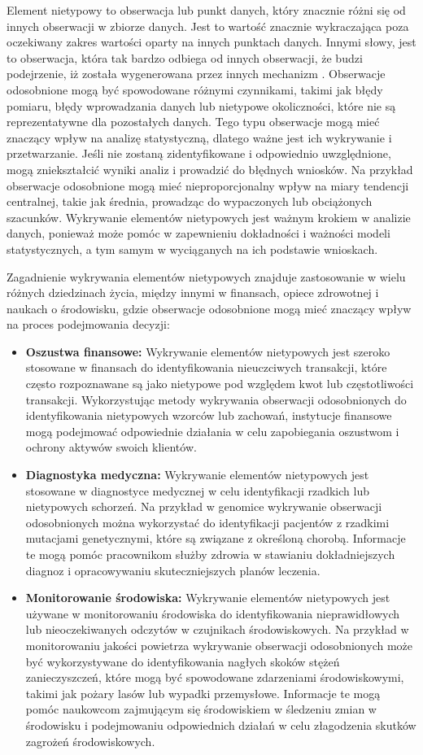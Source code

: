 \documentclass[12pt,a4paper,oneside]{book}
\theoremstyle{definition}
\begin{document}
Element nietypowy to obserwacja lub punkt danych, który znacznie różni się od innych obserwacji w zbiorze danych. Jest to wartość znacznie wykraczająca poza oczekiwany zakres wartości oparty na innych punktach danych. Innymi słowy, jest to obserwacja, która tak bardzo odbiega od innych obserwacji, że budzi podejrzenie, iż została wygenerowana przez innych mechanizm \cite{Hawkins_1980}. Obserwacje odosobnione mogą być spowodowane różnymi czynnikami, takimi jak błędy pomiaru, błędy wprowadzania danych lub nietypowe okoliczności, które nie są reprezentatywne dla pozostałych danych. Tego typu obserwacje mogą mieć znaczący wpływ na analizę statystyczną, dlatego ważne jest ich wykrywanie i przetwarzanie. Jeśli nie zostaną zidentyfikowane i odpowiednio uwzględnione, mogą zniekształcić wyniki analiz i prowadzić do błędnych wniosków. Na przykład obserwacje odosobnione mogą mieć nieproporcjonalny wpływ na miary tendencji centralnej, takie jak średnia, prowadząc do wypaczonych lub obciążonych szacunków. Wykrywanie elementów nietypowych jest ważnym krokiem w analizie danych, ponieważ może pomóc w zapewnieniu dokładności i ważności modeli statystycznych, a tym samym w wyciąganych na ich podstawie wnioskach.

Zagadnienie wykrywania elementów nietypowych znajduje zastosowanie w wielu różnych dziedzinach życia, między innymi w finansach, opiece zdrowotnej i naukach o środowisku, gdzie obserwacje odosobnione mogą mieć znaczący wpływ na proces podejmowania decyzji:
\begin{itemize}
\item \textbf{Oszustwa finansowe:} Wykrywanie elementów nietypowych jest szeroko stosowane w finansach do identyfikowania nieuczciwych transakcji, które często rozpoznawane są jako nietypowe pod względem kwot lub częstotliwości transakcji. Wykorzystując metody wykrywania obserwacji odosobnionych do identyfikowania nietypowych wzorców lub zachowań, instytucje finansowe mogą podejmować odpowiednie działania w celu zapobiegania oszustwom i ochrony aktywów swoich klientów.
\item \textbf{Diagnostyka medyczna:} Wykrywanie elementów nietypowych jest stosowane w diagnostyce medycznej w celu identyfikacji rzadkich lub nietypowych schorzeń. Na przykład w genomice wykrywanie obserwacji odosobnionych można wykorzystać do identyfikacji pacjentów z rzadkimi mutacjami genetycznymi, które są związane z określoną chorobą. Informacje te mogą pomóc pracownikom służby zdrowia w stawianiu dokładniejszych diagnoz i opracowywaniu skuteczniejszych planów leczenia.
\item \textbf{Monitorowanie środowiska:} Wykrywanie elementów nietypowych jest używane w monitorowaniu środowiska do identyfikowania nieprawidłowych lub nieoczekiwanych odczytów w czujnikach środowiskowych. Na przykład w monitorowaniu jakości powietrza wykrywanie obserwacji odosobnionych może być wykorzystywane do identyfikowania nagłych skoków stężeń zanieczyszczeń, które mogą być spowodowane zdarzeniami środowiskowymi, takimi jak pożary lasów lub wypadki przemysłowe. Informacje te mogą pomóc naukowcom zajmującym się środowiskiem w śledzeniu zmian w środowisku i podejmowaniu odpowiednich działań w celu złagodzenia skutków zagrożeń środowiskowych.
\end{itemize}
\end{document}
